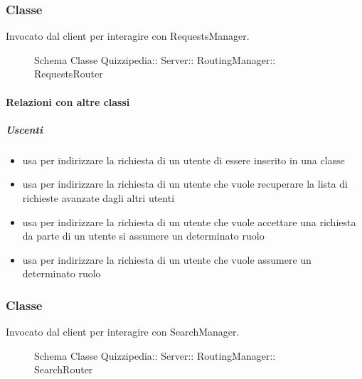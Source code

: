 \subsubsection{Classe }
Invocato dal client per interagire con RequestsManager.
\begin{figure}[H]
\centering
\noindent{}
\caption[Schema Classe RequestsRouter]{Schema Classe Quizzipedia:: Server:: RoutingManager:: RequestsRouter}
\end{figure}
\paragraph{Relazioni con altre classi}
\subparagraph{Uscenti}
\begin{itemize}
\item usa  per indirizzare la richiesta di un utente di essere inserito in una classe
\item usa  per indirizzare la richiesta di un utente che vuole recuperare la lista di richieste avanzate dagli altri utenti
\item usa  per indirizzare la richiesta di un utente che vuole accettare una richiesta da parte di un utente si assumere un determinato ruolo
\item usa  per indirizzare la richiesta di un utente che vuole assumere un determinato ruolo
\end{itemize}
\subsubsection{Classe }
Invocato dal client per interagire con SearchManager.
\begin{figure}[H]
\centering
\noindent{}
\caption[Schema Classe SearchRouter]{Schema Classe Quizzipedia:: Server:: RoutingManager:: SearchRouter}
\end{figure}

